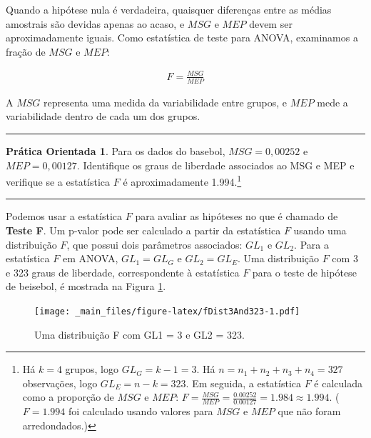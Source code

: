 \documentclass[
]{book}
\theoremstyle{definition}
\theoremstyle{definition}
\theoremstyle{definition}
\newtheorem{exercise}{Prática Orientada}[chapter]
\theoremstyle{definition}
\theoremstyle{remark}
\begin{document}
Quando a hipótese nula é verdadeira, quaisquer diferenças entre as médias amostrais são devidas apenas ao acaso, e \(MSG\) e \(MEP\) devem ser aproximadamente iguais. Como estatística de teste para ANOVA, examinamos a fração de \(MSG\) e \(MEP\):

\begin{align} 
F = \frac{MSG}{MEP}
\label{eq:formulaForTheFStatistic}
\end{align}

A \(MSG\) representa uma medida da variabilidade entre grupos, e \(MEP\) mede a variabilidade dentro de cada um dos grupos.

\begin{center}\rule{0.5\linewidth}{0.5pt}\end{center}

\begin{exercise}
\protect\hypertarget{exr:unnamed-chunk-223}{}{\label{exr:unnamed-chunk-223} }Para os dados do basebol, \(MSG = 0,00252\) e \(MEP = 0,00127\). Identifique os graus de liberdade associados ao MSG e MEP e verifique se a estatística \(F\) é aproximadamente 1.994.\footnote{Há \(k=4\) grupos, logo \(GL_{G} = k-1 = 3\). Há \(n = n_1 + n_2 + n_3 + n_4 = 327\) observações, logo \(GL_{E} = n - k = 323\). Em seguida, a estatística \(F\) é calculada como a proporção de \(MSG\) e \(MEP\): \(F = \frac{MSG}{MEP} = \frac{0.00252}{0.00127} = 1.984 \approx 1.994\). (\(F=1.994\) foi calculado usando valores para \(MSG\) e \(MEP\) que não foram arredondados.)}
\end{exercise}

\begin{center}\rule{0.5\linewidth}{0.5pt}\end{center}

Podemos usar a estatística \(F\) para avaliar as hipóteses no que é chamado de \textbf{Teste F}. Um p-valor pode ser calculado a partir da estatística \(F\) usando uma distribuição \(F\), que possui dois parâmetros associados: \(GL_{1}\) e \(GL_{2}\). Para a estatística \(F\) em ANOVA, \(GL_{1} = GL_{G}\) e \(GL_{2}= GL_{E}\). Uma distribuição \(F\) com 3 e 323 graus de liberdade, correspondente à estatística \(F\) para o teste de hipótese de beisebol, é mostrada na Figura \ref{fig:fDist3And323}.

\begin{figure}
\centering
\texttt{[image: \_main\_files/figure-latex/fDist3And323-1.pdf]}
\caption{\label{fig:fDist3And323}Uma distribuição F com GL1 = 3 e GL2 = 323.}
\end{figure}
\end{document}
